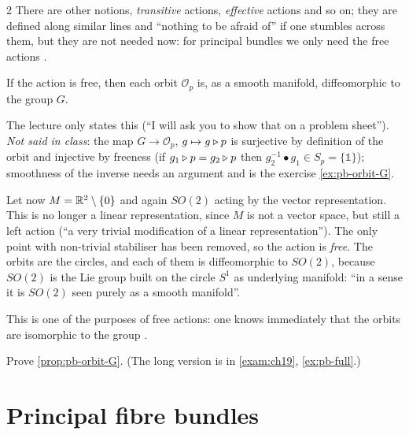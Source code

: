 \begin{paracol}{2}
There are other notions, \emph{transitive} actions, \emph{effective} actions and so on; they are defined along similar lines and ``nothing to be afraid of'' if one stumbles across them, but they are not needed now: for principal bundles we only need the free actions   .
\begin{proposition}\label{prop:pb-orbit-G}
If the action is free, then each orbit $\mathcal O_p$ is, as a smooth manifold, diffeomorphic to the group $G$.  
\end{proposition}
The lecture only states this (``I will ask you to show that on a problem sheet''). \emph{Not said in class}: the map $G\to\mathcal O_p$, $g\mapsto g\mathbin{\triangleright} p$ is surjective by definition of the orbit and injective by freeness (if $g_1\mathbin{\triangleright} p=g_2\mathbin{\triangleright} p$ then $g_2^{-1}\bullet g_1\in S_p=\{\mathbb 1\}$); smoothness of the inverse needs an argument and is the exercise \cref{ex:pb-orbit-G}.
\begin{example}\label{ex:pb-punctured}
Let now $M=\mathbb{R}^2\setminus\{0\}$ and again $SO(2)$ acting by the vector representation. This is no longer a linear representation, since $M$ is not a vector space, but still a left action (``a very trivial modification of a linear representation''). The only point with non-trivial stabiliser has been removed, so the action is \emph{free}. The orbits are the circles, and each of them is diffeomorphic to $SO(2)$, because $SO(2)$ is the Lie group built on the circle $S^1$ as underlying manifold: ``in a sense it is $SO(2)$ seen purely as a smooth manifold''.        
\end{example}
This is one of the purposes of free actions: one knows immediately that the orbits are isomorphic to the group  .
\begin{exercise}\label{ex:pb-orbit-G}
Prove \cref{prop:pb-orbit-G}. (The long version is in \cref{exam:ch19}, \cref{ex:pb-full}.)
\end{exercise}

\section{Principal fibre bundles}\label{sec:pb-def}


\end{paracol}
